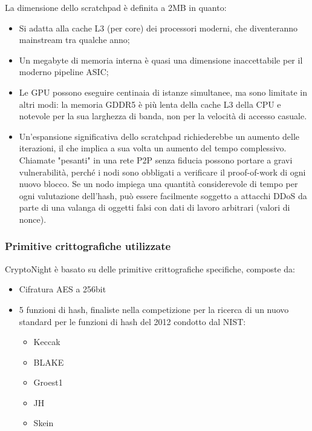 La dimensione dello scratchpad è definita a 2MB in quanto:

\begin{itemize}[noitemsep]
\item
  Si adatta alla cache L3 (per core) dei processori moderni, che
  diventeranno mainstream tra qualche anno;
\item
  Un megabyte di memoria interna è quasi una dimensione inaccettabile
  per il moderno pipeline ASIC;
\item
  Le GPU possono eseguire centinaia di istanze simultanee, ma sono
  limitate in altri modi: la memoria GDDR5 è più lenta della cache L3
  della CPU e notevole per la sua larghezza di banda, non per la
  velocità di accesso casuale.
\item
  Un'espansione significativa dello scratchpad
  richiederebbe un aumento delle iterazioni, il che implica a sua volta
  un aumento del tempo complessivo. Chiamate "pesanti" in una rete P2P
  senza fiducia possono portare a gravi vulnerabilità, perché i nodi
  sono obbligati a verificare il proof-of-work di ogni nuovo blocco. Se
  un nodo impiega una quantità considerevole di tempo per ogni
  valutazione dell'hash, può essere facilmente soggetto
  a attacchi DDoS da parte di una valanga di oggetti falsi con dati di
  lavoro arbitrari (valori di nonce).
\end{itemize}



\subsubsection{Primitive crittografiche utilizzate} \label{primitive-crittografiche-utilizzate}
CryptoNight è basato su delle primitive crittografiche specifiche, composte da: 
\begin{itemize}
  \item Cifratura AES a 256bit
  \item 5 funzioni di hash, finaliste
  nella competizione per la ricerca di un nuovo standard per le funzioni
  di hash del 2012 condotto dal NIST:
  \begin{itemize}[noitemsep,topsep=0pt]
    \item Keccak
    \item BLAKE
    \item Groest1
    \item JH
    \item Skein
  \end{itemize}
\end{itemize}


